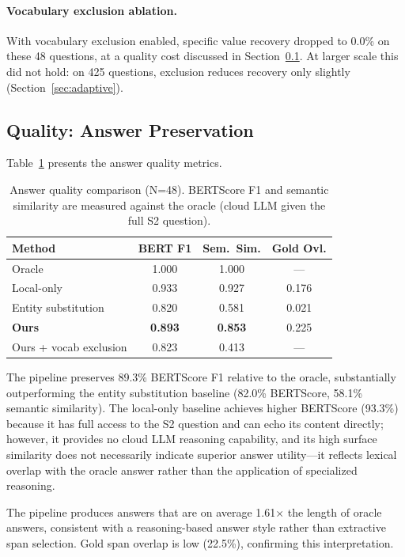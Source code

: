 \documentclass[sigconf,balance=false]{acmart}
\begin{document}
\paragraph{Vocabulary exclusion ablation.} With vocabulary exclusion enabled, specific value recovery dropped to 0.0\% on these 48 questions, at a quality cost discussed in Section~\ref{sec:quality-results}. At larger scale this did not hold: on 425 questions, exclusion reduces recovery only slightly (Section~\ref{sec:adaptive}).

\subsection{Quality: Answer Preservation}
\label{sec:quality-results}

Table~\ref{tab:quality} presents the answer quality metrics.

\begin{table}[h!]
\caption{Answer quality comparison (N=48). BERTScore F1 and semantic similarity are measured against the oracle (cloud LLM given the full S2 question).}
\label{tab:quality}
\small
\begin{tabular}{@{}lccc@{}}
\toprule
\textbf{Method} & \textbf{BERT F1} & \textbf{Sem.\ Sim.} & \textbf{Gold Ovl.} \\
\midrule
Oracle & 1.000 & 1.000 & --- \\
Local-only & 0.933 & 0.927 & 0.176 \\
Entity substitution & 0.820 & 0.581 & 0.021 \\
\textbf{Ours} & \textbf{0.893} & \textbf{0.853} & 0.225 \\
Ours + vocab exclusion & 0.823 & 0.413 & --- \\
\bottomrule
\end{tabular}
\end{table}

The pipeline preserves 89.3\% BERTScore F1 relative to the oracle, substantially outperforming the entity substitution baseline (82.0\% BERTScore, 58.1\% semantic similarity). The local-only baseline achieves higher BERTScore (93.3\%) because it has full access to the S2 question and can echo its content directly; however, it provides no cloud LLM reasoning capability, and its high surface similarity does not necessarily indicate superior answer utility---it reflects lexical overlap with the oracle answer rather than the application of specialized reasoning.

The pipeline produces answers that are on average 1.61$\times$ the length of oracle answers, consistent with a reasoning-based answer style rather than extractive span selection. Gold span overlap is low (22.5\%), confirming this interpretation.
\end{document}
